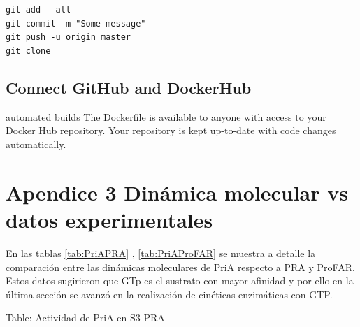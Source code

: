 \documentclass[12pt,twoside]{reedthesis}
\begin{document}
  \texttt{git\ add\ -\/-all}\\
  \texttt{git\ commit\ -m\ "Some\ message"}\\
  \texttt{git\ push\ -u\ origin\ master}\\
  \texttt{git\ clone}
  
  \section{Connect GitHub and
  DockerHub}\label{connect-github-and-dockerhub}
  
  automated builds The Dockerfile is available to anyone with access to
  your Docker Hub repository. Your repository is kept up-to-date with code
  changes automatically.
  
  \chapter{Apendice 3 Dinámica molecular vs datos
  experimentales}\label{apendice-3-dinamica-molecular-vs-datos-experimentales}
  
  En las tablas \autoref{tab:PriAPRA} , \autoref{tab:PriAProFAR} se
  muestra a detalle la comparación entre las dinámicas moleculares de PriA
  respecto a PRA y ProFAR. Estos datos sugirieron que GTp es el sustrato
  con mayor afinidad y por ello en la última sección se avanzó en la
  realización de cinéticas enzimáticas con GTP.
  
  Table: Actividad de PriA en S3 PRA \label{tab:PriAPRA}
  
\end{document}
